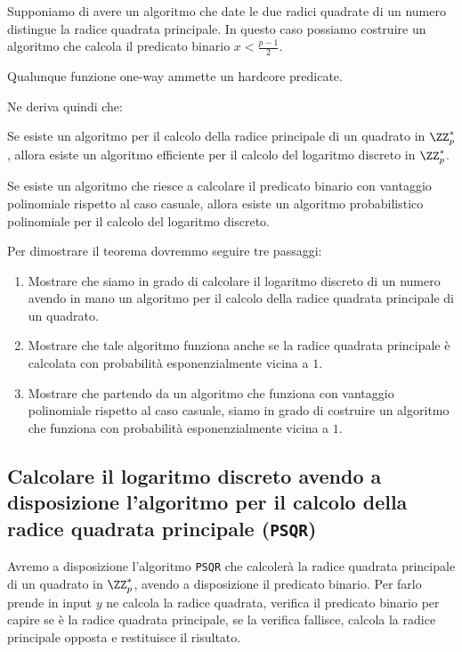   Supponiamo di avere un algoritmo che date le due radici quadrate di un numero 
  distingue la radice quadrata principale. In questo caso possiamo costruire
  un algoritmo che calcola il predicato binario $x < \frac{p-1}{2}$.
  \begin{theorem}
    Qualunque funzione one-way ammette un hardcore predicate.
  \end{theorem}
  Ne deriva quindi che:
  \begin{theorem}
  Se esiste un algoritmo per il calcolo della radice principale 
  di un quadrato in $\ZZ_p^*$, allora esiste un algoritmo efficiente
  per il calcolo del logaritmo discreto in $\ZZ_p^*$.
\end{theorem}
\begin{theorem}
  Se esiste un algoritmo che riesce a calcolare il predicato binario con vantaggio 
  polinomiale rispetto al caso casuale, allora esiste un algoritmo
  probabilistico polinomiale per il calcolo del logaritmo discreto.
\end{theorem}
Per dimostrare il teorema dovremmo seguire tre passaggi:
\begin{enumerate}
  \item Mostrare che siamo in grado di calcolare il logaritmo discreto
  di un numero avendo in mano un algoritmo per il calcolo della radice
  quadrata principale di un quadrato.
  \item Mostrare che tale algoritmo funziona anche se la 
  radice quadrata principale è calcolata con probabilità 
  esponenzialmente vicina a $1$.
  \item Mostrare che partendo da un algoritmo che funziona con vantaggio 
  polinomiale rispetto al caso casuale, siamo in grado di costruire un
  algoritmo che funziona con probabilità esponenzialmente vicina a $1$.
\end{enumerate}
\subsection{Calcolare il logaritmo discreto avendo a disposizione
l'algoritmo per il calcolo della radice quadrata principale (\texttt{PSQR})}
Avremo a disposizione l'algoritmo \texttt{PSQR} che calcolerà la radice
quadrata principale di un quadrato in $\ZZ_p^*$, avendo a disposizione 
il predicato binario. Per farlo prende in input $y$ ne calcola la radice 
quadrata, verifica il predicato binario per capire se è la radice quadrata
principale, se la verifica fallisce, calcola la radice principale 
opposta e restituisce il risultato.

